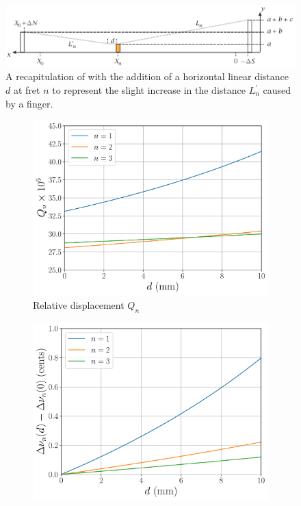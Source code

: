  \begin{figure}
  \centering
  \includegraphics[width=6.0in]{figures/fretting_schematic}
  \caption{\label{fig:fretting_schematic} A recapitulation of  with the addition of a horizontal linear distance $d$ at fret $n$ to represent the slight increase in the distance $L_n^\prime$ caused by a finger.}
 \end{figure}

 \begin{figure}
  \centering
  \begin{subfigure}[b]{0.8\textwidth}
   \centering
   \includegraphics[width=5.0in]{figures/fret_disp}
   \caption{Relative displacement $Q_n$}
   \label{fig:fret_disp}
  \end{subfigure}
  \par\vspace{0.25in}
  \begin{subfigure}[b]{0.8\textwidth}
   \centering
   \includegraphics[width=5.0in]{figures/fret_shift}

\end{subfigure}
\end{figure}
